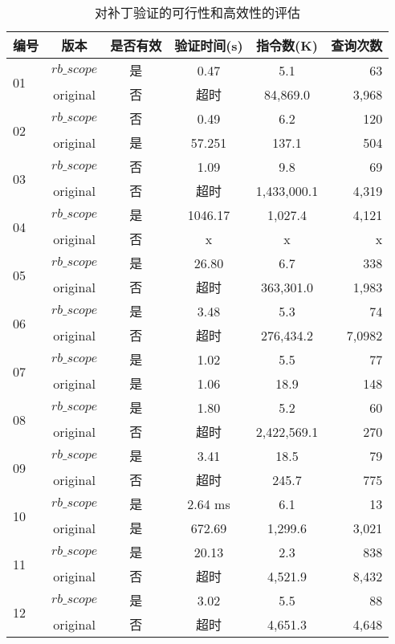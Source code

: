 \begin{table}
  \centering
  \small
  \begin{tabular}{|p{0.80cm}|c|c|c|c|r|}
    \hline
    编号 & 版本 & 是否有效 & 验证时间(s)& 指令数(K) & 查询次数 \\
    \hline
    \multirow{2}{0.80cm}{01}
    & $rb\_scope$ &是 &  0.47  & 5.1 & 63  \\  \cline{2-6}
    & original &  否 & 超时 &   84,869.0 & 3,968  \\
    \hline
    \multirow{2}{0.80cm}{02}
    & $rb\_scope$ &否 & 0.49 & 6.2 & 120  \\  \cline{2-6}
    & original & 是 & 57.251 &  137.1 & 504  \\
    \hline
    \multirow{2}{0.80cm}{03}
    & $rb\_scope$ &否 & 1.09 & 9.8 & 69  \\  \cline{2-6}
    & original &  否 & 超时 &  1,433,000.1 & 4,319  \\
    \hline
    \multirow{2}{0.80cm}{04}
    & $rb\_scope$ &是 &  1046.17 & 1,027.4 & 4,121  \\  \cline{2-6}
    & original & 否 & x &  x & x  \\
    \hline
    \multirow{2}{0.80cm}{05}
    & $rb\_scope$ &是 &  26.80 & 6.7 & 338  \\  \cline{2-6}
    & original & 否 & 超时 &  363,301.0 & 1,983   \\
    \hline
    \multirow{2}{0.80cm}{06}
    & $rb\_scope$ &是 &  3.48 & 5.3 & 74  \\  \cline{2-6}
    & original & 否 &超时  & 276,434.2 & 7,0982  \\
    \hline
    \multirow{2}{0.80cm}{07}
    & $rb\_scope$ &是 &  1.02 & 5.5 & 77  \\  \cline{2-6}
    & original & 是 & 1.06 & 18.9   & 148  \\
    \hline
    \multirow{2}{0.80cm}{08}
    & $rb\_scope$ &是 &  1.80 & 5.2 & 60  \\  \cline{2-6}
    & original & 否 & 超时 &  2,422,569.1 & 270  \\
    \hline
    \multirow{2}{0.80cm}{09}
    & $rb\_scope$ &是 &  3.41 & 18.5 & 79  \\  \cline{2-6}
    & original & 否 & 超时 &  245.7 & 775  \\
    \hline
    \multirow{2}{0.80cm}{10}
    & $rb\_scope$ &是 &  2.64 ms & 6.1 & 13  \\  \cline{2-6}
    & original & 是 & 672.69  &  1,299.6 & 3,021  \\
    \hline
    \multirow{2}{0.80cm}{11}
    & $rb\_scope$ &是 &  20.13 & 2.3 & 838  \\  \cline{2-6}
    & original & 否 & 超时  &  4,521.9 & 8,432  \\
    \hline
    \multirow{2}{0.80cm}{12}
    & $rb\_scope$ &是 &  3.02 & 5.5 & 88  \\  \cline{2-6}
    & original & 否 & 超时 &  4,651.3 & 4,648  \\
    \hline
  \end{tabular}
  \caption{对补丁验证的可行性和高效性的评估}
  \label{tab:eval1}
\end{table}

